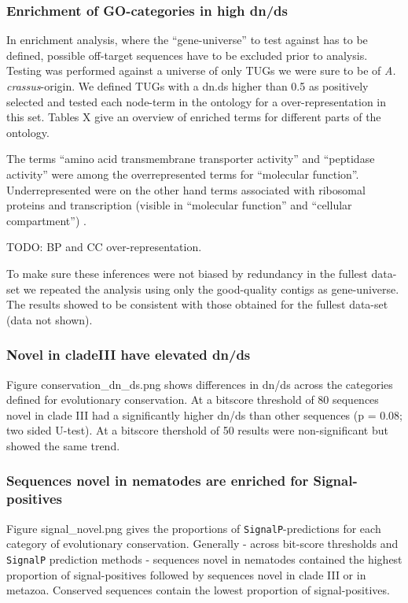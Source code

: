 \documentclass[10pt]{bmc_article}
\newenvironment{bmcformat}{\begin{raggedright}\baselineskip20pt\sloppy\setboolean{publ}{false}}{\end{raggedright}\baselineskip20pt\sloppy}
\begin{document}
\begin{bmcformat}
\subsubsection*{Enrichment of GO-categories in high dn/ds}

In enrichment analysis, where the ``gene-universe'' to test against
has to be defined, possible off-target sequences have to be excluded
prior to analysis. Testing was performed against a universe of only
TUGs we were sure to be of \textit{A. crassus}-origin. We defined TUGs
with a dn.ds higher than 0.5 as positively selected and tested each
node-term in the ontology for a over-representation in this set. Tables
X give an overview of enriched terms for different parts of the
ontology.

The terms ``amino acid transmembrane transporter activity'' and
``peptidase activity'' were among the overrepresented terms for
``molecular function''. Underrepresented were on the other hand terms
associated with ribosomal proteins and transcription (visible in
``molecular function'' and ``cellular compartment'') .

TODO: BP and CC over-representation. 

To make sure these inferences were not biased by redundancy in the
fullest data-set we repeated the analysis using only the good-quality
contigs as gene-universe. The results showed to be consistent with
those obtained for the fullest data-set (data not shown).

\subsubsection*{Novel in cladeIII have elevated dn/ds}

Figure conservation\_dn\_ds.png shows differences in dn/ds across the
categories defined for evolutionary conservation. At a bitscore
threshold of 80 sequences novel in clade III had a significantly
higher dn/ds than other sequences (p =
0.08; two sided U-test). At a
bitscore thershold of 50 results were non-significant but showed the
same trend.

\subsubsection*{Sequences novel in nematodes are enriched for
  Signal-positives}

Figure signal\_novel.png gives the proportions of
\texttt{SignalP}-predictions for each category of evolutionary
conservation. Generally - across bit-score thresholds and
\texttt{SignalP} prediction methods - sequences novel in nematodes
contained the highest proportion of signal-positives followed by
sequences novel in clade III or in metazoa. Conserved sequences
contain the lowest proportion of signal-positives.


\end{bmcformat}
\end{document}
